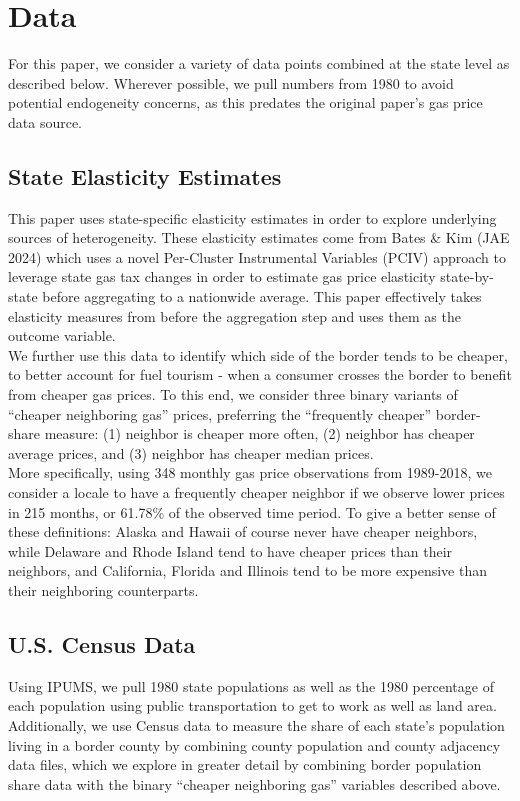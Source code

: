 \documentclass[12pt,a4paper]{article}
\begin{document}
\section{Data}
For this paper, we consider a variety of data points combined at the state level as described below. Wherever possible, we pull numbers from 1980 to avoid potential endogeneity concerns, as this predates the original paper's gas price data source. 

\subsection{State Elasticity Estimates}
This paper uses state-specific elasticity estimates in order to explore underlying sources of heterogeneity. These elasticity estimates come from Bates \& Kim (JAE 2024) which uses a novel Per-Cluster Instrumental Variables (PCIV) approach to leverage state gas tax changes in order to estimate gas price elasticity state-by-state before aggregating to a nationwide average. This paper effectively takes elasticity measures from before the aggregation step and uses them as the outcome variable. \\

We further use this data to identify which side of the border tends to be cheaper, to better account for fuel tourism - when a consumer crosses the border to benefit from cheaper gas prices. To this end, we consider three binary variants of ``cheaper neighboring gas'' prices, preferring the ``frequently cheaper'' border-share measure: (1) neighbor is cheaper more often, (2) neighbor has cheaper average prices, and (3) neighbor has cheaper median prices. \\

More specifically, using 348 monthly gas price observations from 1989-2018, we consider a locale to have a frequently cheaper neighbor if we observe lower prices in 215 months, or 61.78\% of the observed time period. To give a better sense of these definitions: Alaska and Hawaii of course never have cheaper neighbors, while Delaware and Rhode Island tend to have cheaper prices than their neighbors, and California, Florida and Illinois tend to be more expensive than their neighboring counterparts. \\

\subsection{U.S. Census Data}
Using IPUMS, we pull 1980 state populations as well as the 1980 percentage of each population using public transportation to get to work as well as land area. Additionally, we use Census data to measure the share of each state's population living in a border county by combining county population and county adjacency data files, which we explore in greater detail by combining border population share data with the binary ``cheaper neighboring gas'' variables described above. \\
\end{document}
